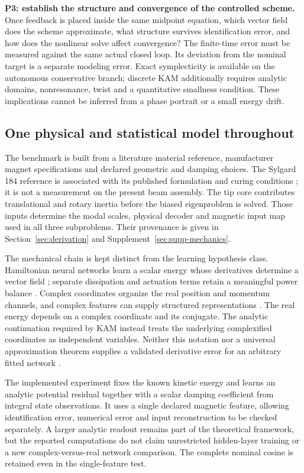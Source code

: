 \textbf{P3: establish the structure and convergence of the controlled scheme.} Once feedback is placed inside the same midpoint equation, which vector field does the scheme approximate, what structure survives identification error, and how does the nonlinear solve affect convergence? The finite-time error must be measured against the same actual closed loop. Its deviation from the nominal target is a separate modeling error. Exact symplecticity is available on the autonomous conservative branch; discrete KAM additionally requires analytic domains, nonresonance, twist and a quantitative smallness condition. These implications cannot be inferred from a phase portrait or a small energy drift.

\subsection{One physical and statistical model throughout}
The benchmark is built from a literature material reference, manufacturer magnet specifications and declared geometric and damping choices. The Sylgard 184 reference is associated with its published formulation and curing conditions \citep{cho2021pdms}; it is not a measurement on the present beam assembly. The tip core contributes translational and rotary inertia before the biased eigenproblem is solved. Those inputs determine the modal scales, physical decoder and magnetic input map used in all three subproblems. Their provenance is given in Section~\ref{sec:derivation} and Supplement~\ref{sec:supp-mechanics}.

The mechanical chain is kept distinct from the learning hypothesis class. Hamiltonian neural networks learn a scalar energy whose derivatives determine a vector field \citep{greydanus}; separate dissipation and actuation terms retain a meaningful power balance \citep{zhong,desai}. Complex coordinates organize the real position and momentum channels, and complex features can supply structured representations \citep{trabelsi}. The real energy depends on a complex coordinate and its conjugate. The analytic continuation required by KAM instead treats the underlying complexified coordinates as independent variables. Neither this notation nor a universal approximation theorem supplies a validated derivative error for an arbitrary fitted network \citep{hornik,zhang}.

The implemented experiment fixes the known kinetic energy and learns an analytic potential residual together with a scalar damping coefficient from integral state observations. It uses a single declared magnetic feature, allowing identification error, numerical error and input reconstruction to be checked separately. A larger analytic readout remains part of the theoretical framework, but the reported computations do not claim unrestricted hidden-layer training or a new complex-versus-real network comparison. The complete nominal cosine is retained even in the single-feature test.


